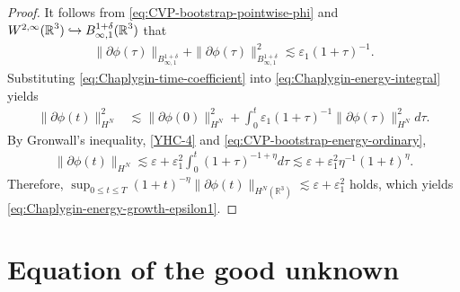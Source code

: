 \documentclass[11pt,twoside]{article}
\def\R{\mathop{\mathbb R\kern 0pt}\nolimits}
\def\ds{\displaystyle}
\def\ve{\varepsilon}
\def\ls{\lesssim}
\theoremstyle{plain}
\theoremstyle{definition}
\theoremstyle{assumption}
\numberwithin{equation}{section}
\begin{document}
\begin{proof}
		It follows from \eqref{eq:CVP-bootstrap-pointwise-phi} and $W^{2,\infty}(\R^3) \hookrightarrow B_{\infty,1}^{1+\delta}(\R^3)$ that
		\begin{equation}\label{eq:Chaplygin-time-coefficient}
			\begin{aligned}
				\|\partial\phi(\tau)\|_{B_{\infty,1}^{1+\delta}}
				+\|\partial\phi(\tau)\|_{B_{\infty,1}^{1+\delta}}^2
				\ls
				\varepsilon_1(1+\tau)^{-1}.
			\end{aligned}
		\end{equation}
		Substituting \eqref{eq:Chaplygin-time-coefficient} into
		\eqref{eq:Chaplygin-energy-integral} yields
		\begin{equation}\label{eq:Chaplygin-before-Gronwall}
			\begin{aligned}
				\|\partial\phi(t)\|_{H^N}^2
				&\ls
				\|\partial\phi(0)\|_{H^N}^2
				+
				\int_0^t
				\varepsilon_1(1+\tau)^{-1}
				\|\partial\phi(\tau)\|_{H^N}^2
				d\tau.
			\end{aligned}
		\end{equation}
		By Gronwall's inequality, \eqref{YHC-4} and \eqref{eq:CVP-bootstrap-energy-ordinary},
		\begin{equation}\label{eq:Chaplygin-after-Gronwall}
			\begin{aligned}
				\|\partial\phi(t)\|_{H^N}
				\ls
				\ve + \ve_1^2 \int_{0}^{t} (1+\tau)^{-1+\eta}d\tau
				\ls
				\ve + \ve_1^2 \eta^{-1}(1+t)^\eta.
			\end{aligned}
		\end{equation}
		Therefore, $\ds\sup_{0\le t\le T}(1+t)^{-\eta}\|\partial\phi(t)\|_{H^N(\mathbb R^3)}
			\ls \ve +\ve_1^2$ holds, which yields \eqref{eq:Chaplygin-energy-growth-epsilon1}.
	\end{proof}

	
	
	\section{Equation of the good unknown}
	\label{sec:equation-for-V}
	
\end{document}

